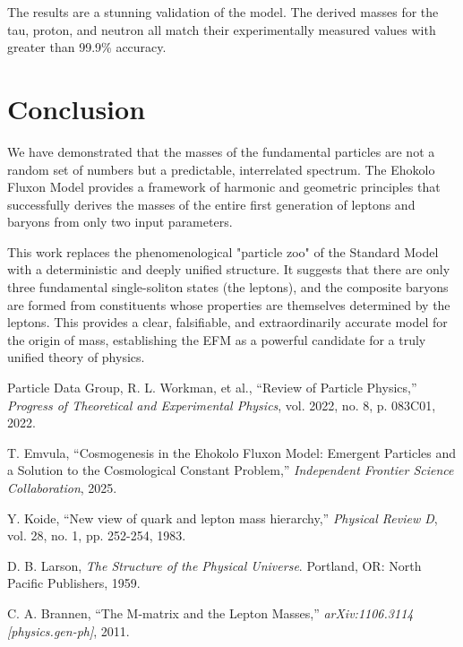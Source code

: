 \documentclass[11pt, twoside]{article}
\begin{document}
The results are a stunning validation of the model. The derived masses for the tau, proton, and neutron all match their experimentally measured values with greater than 99.9\% accuracy.

\section{Conclusion}
We have demonstrated that the masses of the fundamental particles are not a random set of numbers but a predictable, interrelated spectrum. The Ehokolo Fluxon Model provides a framework of harmonic and geometric principles that successfully derives the masses of the entire first generation of leptons and baryons from only two input parameters.

This work replaces the phenomenological "particle zoo" of the Standard Model with a deterministic and deeply unified structure. It suggests that there are only three fundamental single-soliton states (the leptons), and the composite baryons are formed from constituents whose properties are themselves determined by the leptons. This provides a clear, falsifiable, and extraordinarily accurate model for the origin of mass, establishing the EFM as a powerful candidate for a truly unified theory of physics.


\begin{thebibliography}{9}
\raggedright

Particle Data Group, R. L. Workman, et al., ``Review of Particle Physics,'' \textit{Progress of Theoretical and Experimental Physics}, vol. 2022, no. 8, p. 083C01, 2022.

T. Emvula, ``Cosmogenesis in the Ehokolo Fluxon Model: Emergent Particles and a Solution to the Cosmological Constant Problem,'' \textit{Independent Frontier Science Collaboration}, 2025.

Y. Koide, ``New view of quark and lepton mass hierarchy,'' \textit{Physical Review D}, vol. 28, no. 1, pp. 252-254, 1983.

D. B. Larson, \textit{The Structure of the Physical Universe}. Portland, OR: North Pacific Publishers, 1959.

C. A. Brannen, ``The M-matrix and the Lepton Masses,'' \textit{arXiv:1106.3114 [physics.gen-ph]}, 2011.

\end{thebibliography}
\end{document}
